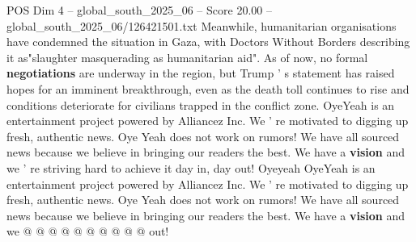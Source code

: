 \begin{textsample}{POS Dim 4 – global\_south\_2025\_06 – Score 20.00 – global\_south\_2025\_06/126421501.txt}
Meanwhile, humanitarian organisations have condemned the situation in Gaza, with Doctors Without Borders describing it as"slaughter masquerading as humanitarian aid".
As of now, no formal \textbf{negotiations} are underway in the region, but Trump ' s statement has raised hopes for an imminent breakthrough, even as the death toll continues to rise and conditions deteriorate for civilians trapped in the conflict zone.
OyeYeah is an entertainment project powered by Alliancez Inc.
We ' re motivated to digging up fresh, authentic news.
Oye Yeah does not work on rumors!
We have all sourced news because we believe in bringing our readers the best.
We have a \textbf{vision} and we ' re striving hard to achieve it day in, day out!
Oyeyeah OyeYeah is an entertainment project powered by Alliancez Inc.
We ' re motivated to digging up fresh, authentic news.
Oye Yeah does not work on rumors!
We have all sourced news because we believe in bringing our readers the best.
We have a \textbf{vision} and we @ @ @ @ @ @ @ @ @ @ out!

\end{textsample}
